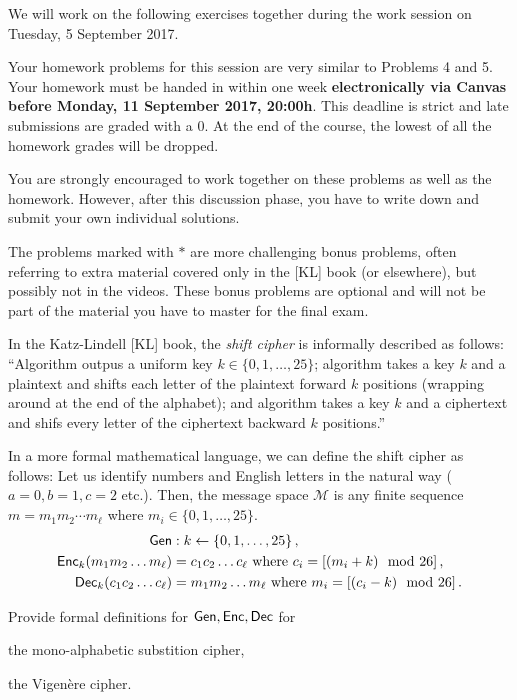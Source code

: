 \documentclass[a4paper,10pt,landscape,twocolumn]{scrartcl}
\newcommand\deadline{Monday, 11 September 2017, 20:00h}
\begin{document}
\problems

{\sffamily\noindent
We will work on the following exercises together during the work session on Tuesday, 5 September 2017.

Your homework problems for this session are very similar to Problems 4 and 5. Your homework must be handed in within one week \textbf{electronically via Canvas before \deadline}. This deadline is strict and late submissions are graded with a 0. At the end of the course, the lowest of all the homework grades will be dropped. 

You are strongly encouraged to work together on these problems as well as the homework. However, after this discussion phase, you have to write down and submit your own individual solutions. 

The problems marked with $\ast$ are more challenging bonus problems, often referring to extra material covered only in the [KL] book (or elsewhere), but possibly not in the videos. These bonus problems are optional and will not be part of the material you have to master for the final exam. 
}

\begin{exercise}
In the Katz-Lindell [KL] book, the \emph{shift cipher} is informally described as follows: ``Algorithm \gen outpus a uniform key $k \in \{0,1,\ldots, 25\}$; algorithm \enc takes a key $k$ and a plaintext and shifts each letter of the plaintext forward $k$ positions (wrapping around at the end of the alphabet); and algorithm \dec takes a key $k$ and a ciphertext and shifs every letter of the ciphertext backward $k$ positions.''

In a more formal mathematical language, we can define the shift cipher as follows: Let us identify numbers and English letters in the natural way ($a=0, b=1, c=2$ etc.). Then, the message space $\mathcal{M}$ is any finite sequence $m=m_1 m_2 \cdots m_\ell$ where $m_i \in \{0,1,\ldots,25\}$.
\begin{align*}
\mathsf{Gen}&: k \leftarrow \{0,1,\ldots, 25\} \, ,\\
\mathsf{Enc}_k(m_1 m_2 \ldots m_\ell) &= c_1 c_2 \ldots c_\ell  \mbox{ where }c_i = [(m_i + k) \mod 26] \, ,\\
\mathsf{Dec}_k(c_1 c_2 \ldots c_\ell) &= m_1 m_2 \ldots m_\ell  \mbox{ where }m_i = [(c_i - k) \mod 26] \, .
\end{align*}

Provide formal definitions for $\mathsf{Gen}, \mathsf{Enc}, \mathsf{Dec}$ for 
\begin{subex}
the mono-alphabetic substition cipher,
\end{subex}
\begin{subex}
the Vigen{\`e}re cipher.
\end{subex}
\end{exercise}
\end{document}
